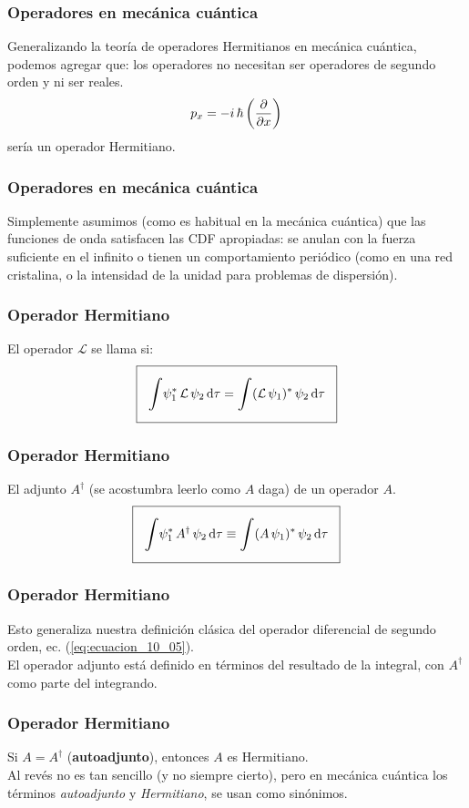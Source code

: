 \documentclass[12pt]{beamer}
\begin{document}
\begin{frame}
\frametitle{Operadores en mecánica cuántica}
Generalizando la teoría de operadores Hermitianos en mecánica cuántica, podemos agregar que: los operadores no necesitan ser operadores de segundo orden y ni ser reales. 
\pause
\begin{align*}
p_{x} = - i \, \hbar \left(\pdv{x}\right)
\end{align*}
sería un operador Hermitiano.
\end{frame}
\begin{frame}
\frametitle{Operadores en mecánica cuántica}
Simplemente asumimos (como es habitual en la mecánica cuántica) que las funciones de onda satisfacen las CDF apropiadas: se anulan con la fuerza suficiente en el infinito o tienen un comportamiento periódico (como en una red cristalina, o la intensidad de la unidad para problemas de dispersión). 
\end{frame}
\begin{frame}
\frametitle{Operador Hermitiano}
El operador $\mathcal{L}$ se llama  si:
\pause
\begin{align}
\setlength{\fboxsep}{3\fboxsep}\boxed{\scaleint{6ex} \psi_{1}^{*} \, \mathcal{L} \, \psi_{2} \dd{\tau} =  \scaleint{6ex} (\mathcal{L} \, \psi_{1})^{*} \, \psi_{2} \dd{\tau}}
\label{eq:ecuacion_10_26}
\end{align}
\end{frame}
\begin{frame}
\frametitle{Operador Hermitiano}
El adjunto $A^{\dagger}$ (se acostumbra leerlo como $A$ daga) de un operador $A$.
\pause
\begin{align}
\setlength{\fboxsep}{3\fboxsep}\boxed{\scaleint{6ex} \psi_{1}^{*} \, A^{\dagger} \, \psi_{2} \dd{\tau} \equiv \scaleint{6ex} (A \, \psi_{1})^{*} \, \psi_{2} \dd{\tau}}
\label{eq:ecuacion_10_27}
\end{align}
\end{frame}
\begin{frame}
\frametitle{Operador Hermitiano}
Esto generaliza nuestra definición clásica del operador diferencial de segundo orden, ec. (\ref{eq:ecuacion_10_05}). 
\\
\bigskip
\pause
El operador adjunto está definido en términos del resultado de la integral, con $A^{\dagger}$ como parte del integrando. 
\end{frame}
\begin{frame}
\frametitle{Operador Hermitiano}
Si $A = A^{\dagger}$ (\textbf{autoadjunto}), entonces $A$ es Hermitiano.
\\
\bigskip
\pause
Al revés no es tan sencillo (y no siempre cierto), pero en mecánica cuántica los términos \emph{autoadjunto} y \emph{Hermitiano}, se usan como sinónimos.
\end{frame}
\end{document}
